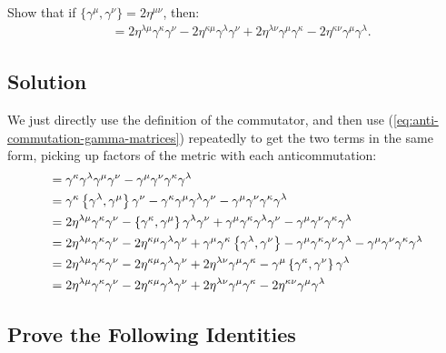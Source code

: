 Show that if $\{\gamma^\mu, \gamma^\nu\} = 2\eta^{\mu\nu}$, then:
\begin{align}
    [\gamma^\kappa\gamma^\lambda, \gamma^\mu\gamma^\nu] 
    &= 2\eta^{\lambda\mu}\gamma^\kappa\gamma^\nu - 2\eta^{\kappa\mu}\gamma^\lambda\gamma^\nu + 2\eta^{\lambda\nu}\gamma^\mu\gamma^\kappa - 2\eta^{\kappa\nu}\gamma^\mu\gamma^\lambda.\label{eq:anti-commutation-gamma-matrices}
\end{align}
\subsection*{Solution}
We just directly use the definition of the commutator, and then use (\ref{eq:anti-commutation-gamma-matrices}) repeatedly to get the two terms in the same form, picking up factors of the metric with each anticommutation:
\begin{align*}
    [\gamma^\kappa\gamma^\lambda, \gamma^\mu\gamma^\nu]&=\gamma^\kappa\gamma^\lambda\gamma^\mu\gamma^\nu - \gamma^\mu\gamma^\nu\gamma^\kappa\gamma^\lambda\notag\\
    &=\gamma^\kappa\left\{\gamma^\lambda,\gamma^\mu\right\}\gamma^\nu - \gamma^\kappa\gamma^\mu\gamma^\lambda\gamma^\nu - \gamma^\mu\gamma^\nu\gamma^\kappa\gamma^\lambda\notag\\
    &=2\eta^{\lambda\mu}\gamma^\kappa\gamma^\nu - \left\{\gamma^\kappa,\gamma^\mu\right\}\gamma^\lambda\gamma^\nu + \gamma^\mu\gamma^\kappa\gamma^\lambda\gamma^\nu - \gamma^\mu\gamma^\nu\gamma^\kappa\gamma^\lambda\notag\\
    &=2\eta^{\lambda\mu}\gamma^\kappa\gamma^\nu -2\eta^{\kappa\mu}\gamma^\lambda\gamma^\nu + \gamma^\mu\gamma^\kappa\left\{\gamma^\lambda,\gamma^\nu\right\} - \gamma^\mu\gamma^\kappa\gamma^\nu\gamma^\lambda - \gamma^\mu\gamma^\nu\gamma^\kappa\gamma^\lambda\notag\\
    &=2\eta^{\lambda\mu}\gamma^\kappa\gamma^\nu -2\eta^{\kappa\mu}\gamma^\lambda\gamma^\nu+2\eta^{\lambda\nu}\gamma^\mu\gamma^\kappa - \gamma^\mu\left\{\gamma^\kappa,\gamma^\nu\right\}\gamma^\lambda\notag\\
    &=2\eta^{\lambda\mu}\gamma^\kappa\gamma^\nu -2\eta^{\kappa\mu}\gamma^\lambda\gamma^\nu+2\eta^{\lambda\nu}\gamma^\mu\gamma^\kappa - 2\eta^{\kappa\nu}\gamma^\mu\gamma^\lambda
\end{align*}
\subsection*{Prove the Following Identities}


